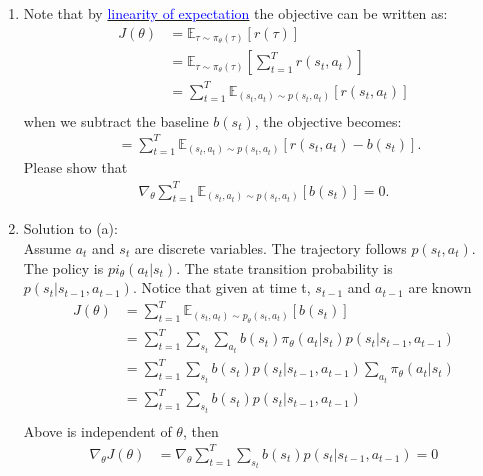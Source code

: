 \documentclass[12pt]{article}
\begin{document}
\begin{enumerate} [label=(\alph*)]
\item Note that by \href{https://brilliant.org/wiki/linearity-of-expectation/}{\textcolor{blue}{linearity of expectation}} the objective can be written as:
\begin{align*}
    J(\theta) &= \mathbb{E}_{\tau \sim \pi_\theta(\tau)} \left[r(\tau)\right] \\
    &= \mathbb{E}_{\tau \sim \pi_\theta(\tau)} \left[\sum_{t=1}^{T} r(s_t, a_t)\right] \\
    &= \sum_{t=1}^{T} \mathbb{E}_{(s_t, a_t) \sim p(s_t, a_t)} \left[r(s_t, a_t)\right] \\
\end{align*}
when we subtract the baseline $b(s_t)$, the objective becomes:
\begin{align*}
    &= \sum_{t=1}^{T} \mathbb{E}_{(s_t, a_t) \sim p(s_t, a_t)} \left[r(s_t, a_t) - b(s_t)\right].
\end{align*}
Please show that
\begin{align*}
\nabla_\theta \sum_{t=1}^{T} \mathbb{E}_{(s_t, a_t) \sim p(s_t, a_t)} \left[b(s_t)\right] = 0.
\end{align*}

\item Solution to (a): \\
Assume $a_t$ and $s_t$ are discrete variables.
The trajectory follows  $p(s_t, a_t)$.
The policy is $pi_\theta(a_t|s_t)$.
The state transition probability is $p(s_t|s_{t-1},a_{t-1})$.
Notice that given at time t, $s_{t-1}$ and $a_{t-1}$ are known
\begin{align*}
    J(\theta) &= \sum_{t=1}^{T} \mathbb{E}_{(s_t, a_t) \sim p_\theta(s_t, a_t)} \left[b(s_t)\right] \\
    &= \sum_{t=1}^{T} \sum_{s_t}{ \sum_{a_t}{b(s_t)\pi_\theta(a_t|s_t)p(s_t|s_{t-1},a_{t-1})} } \\
    &= \sum_{t=1}^{T} \sum_{s_t}{ b(s_t)p(s_t|s_{t-1},a_{t-1})  \sum_{a_t} {\pi_\theta(a_t|s_t)}} \\
    &= \sum_{t=1}^{T} \sum_{s_t}{ b(s_t)p(s_t|s_{t-1},a_{t-1})}\\
\end{align*}
Above is independent of $\theta$, then 
\begin{align*}
    \nabla_\theta J(\theta) &= \nabla_\theta \sum_{t=1}^{T} \sum_{s_t}{ b(s_t)p(s_t|s_{t-1},a_{t-1})} =0 	
\end{align*}




\end{enumerate}
\end{document}
